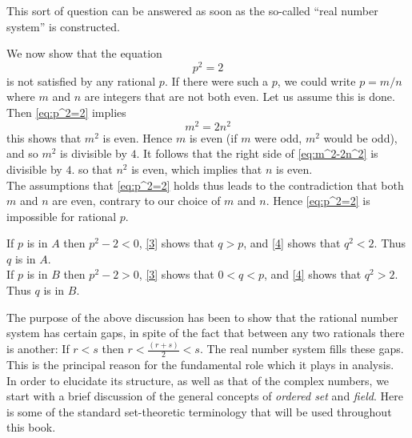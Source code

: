 \indent This sort of question can be answered as soon as the so-called ``real number system''
is constructed.

\begin{example}
  We now show that the equation
  \begin{equation}\label{eq:p^2=2}
    p^2 = 2
  \end{equation}
  is not satisfied by any rational $p$. If there were such a $p$, we could write $p=m/n$ where $m$ and $n$ are integers 
  that are not both even. Let us assume this is done. Then \ref{eq:p^2=2} implies
  \begin{equation}\label{eq:m^2-2n^2}
    m^2 =2n^2
  \end{equation}
  this shows that $m^2$ is even. Hence $m$ is even (if $m$ were odd, $m^2$ would be odd), and so $m^2$ is divisible by $4$. 
  It follows that the right side of \ref{eq:m^2-2n^2} is divisible by $4$. so that $n^2$ is even, which implies that $n$ is even.\\
  \indent The assumptions that \ref{eq:p^2=2} holds thus leads to the contradiction that both $m$ and $n$ are even, contrary to our 
  choice of $m$ and $n$. Hence \ref{eq:p^2=2} is impossible for rational $p$.





  \indent If $p$ is in $A$ then $p^2-2<0$, \ref{3} shows that $q>p$, and \ref{4} shows that $q^2<2$. Thus $q$ is in $A$.\\
  \indent If $p$ is in $B$ then $p^2-2>0$, \ref{3} shows that $0<q<p$, and \ref{4} shows that $q^2>2$. Thus $q$ is in $B$.
\end{example}

\begin{remark}
  The purpose of the above discussion has been to show that the rational number system has certain gaps, in spite of the 
  fact that between any two rationals there is another: If $r<s$ then $r<\frac{(r+s)}{2}<s$. The real number system fills these 
  gaps. This is the principal reason for the fundamental role which it plays in analysis.\\
  \indent In order to elucidate its structure, as well as that of the complex numbers, we start with a brief discussion of the 
  general concepts of \emph{ordered set} and \emph{field}. Here is some of the standard set-theoretic terminology that will be 
  used throughout this book.
\end{remark}


